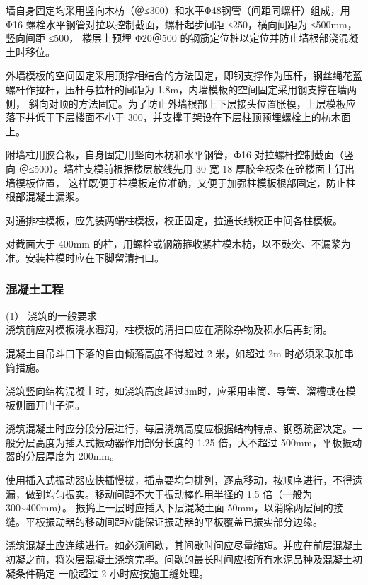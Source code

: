 墙自身固定均采用竖向木枋（＠≤300）和水平Φ48钢管（间距同螺杆）组成，用 Φ16 螺栓水平钢管对拉以控制截面，螺杆起步间距 ≤250，横向间距为 ≤500mm，竖向间距 ≤500，
楼层上预埋 Φ20＠500 的钢筋定位桩以定位并防止墙根部浇混凝土时移位。

外墙模板的空间固定采用顶撑相结合的方法固定，即钢支撑作为压杆，钢丝绳花蓝螺杆作拉杆，压杆与拉杆的间距为 1.8m，内墙模板的空间固定采用钢支撑在墙两侧，
斜向对顶的方法固定。为了防止外墙根部上下层接头位置胀模，上层模板应落下并低于下层楼面不小于 300，并支撑于架设在下层柱顶预埋螺栓上的枋木面上。

附墙柱用胶合板，自身固定用坚向木枋和水平钢管，Ф16 对拉螺杆控制截面（竖向 ＠≤500）。墙柱支模前根据楼层放线先用 30 宽 18 厚胶全板条在砼楼面上钉出墙模板位置，
这样既便于柱模板定位准确，又便于加强柱模板根部固定，防止柱根部混凝土漏浆。

对通排柱模板，应先装两端柱模板，校正固定，拉通长线校正中间各柱模板。

对截面大于	400mm 的柱，用螺栓或钢筋箍收紧柱模木枋，以不鼓突、不漏浆为准。安装柱模时应在下脚留清扫口。


\subsubsection{混凝土工程}

(1） 浇筑的一般要求\\

 浇筑前应对模板浇水湿润，柱模板的清扫口应在清除杂物及积水后再封闭。

 混凝土自吊斗口下落的自由倾落高度不得超过 2 米，如超过 2m 时必须采取加串筒措施。

 浇筑竖向结构混凝土时，如浇筑高度超过3m时，应采用串筒、导管、溜槽或在模板侧面开门子洞。

 浇筑混凝土时应分段分层进行，每层浇筑高度应根据结构特点、钢筋疏密决定。一般分层高度为插入式振动器作用部分长度的 1.25 倍，大不超过 500mm，平板振动器的分层厚度为 200mm。

 使用插入式振动器应快插慢拔，插点要均匀排列，逐点移动，按顺序进行，不得遗漏，做到均匀振实。移动问距不大于振动棒作用半径的 1.5 倍（一般为 300\textasciitilde400mm）。
振捣上一层时应插入下层混凝土面 50mm，以消除两层间的接缝。平板振动器的移动间距应能保证振动器的平板覆盖已振实部分边缘。

 浇筑混凝土应连续进行。如必须间歇，其间歇时问应尽量缩短。并应在前层混凝土初凝之前，将次层混凝土浇筑完毕。问歇的最长时间应按所有水泥品种及混凝土初凝条件确定
一般超过 2 小时应按施工缝处理。


